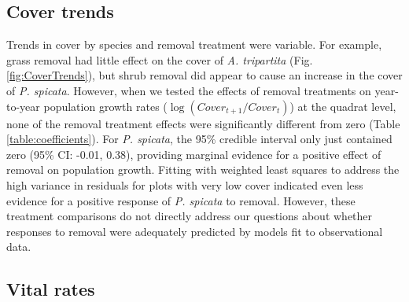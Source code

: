\documentclass[11pt]{article}
\begin{document}
\begin{doublespacing}
\subsection*{Cover trends}

Trends in cover by species and removal treatment were variable. For example, grass removal had little effect on the cover of \textit{A. tripartita} 
(Fig. \ref{fig:CoverTrends}), but shrub removal did appear to cause an increase in the cover of \textit{P. spicata}. 
However, when we tested the effects of removal treatments on year-to-year population growth rates ($\log(Cover_{t+1}/Cover_t)$) at the quadrat level,
 none of the removal treatment effects were significantly different from zero (Table \ref{table:coefficients}). For \textit{P. spicata}, 
the 95\% credible interval only just contained zero (95\% CI: -0.01, 0.38), providing marginal evidence for a positive effect of removal on population growth. 
Fitting with weighted least squares to address the high variance in residuals for plots with very low cover indicated even less evidence for a positive 
response of  \textit{P. spicata} to removal. However, these treatment comparisons do not directly address our questions about whether 
responses to removal were adequately predicted by models fit to observational data. 


\subsection*{Vital rates}


\end{doublespacing}
\end{document}

